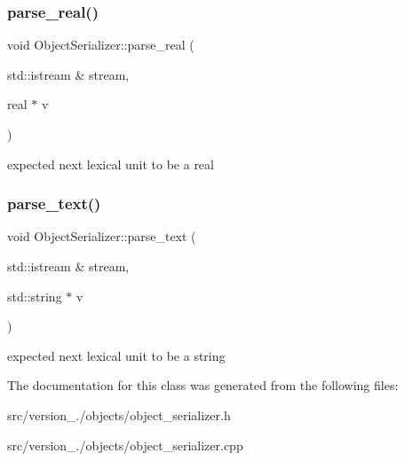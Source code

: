 \subsubsection{\texorpdfstring{parse\+\_\+real()}{parse\_real()}}
{\footnotesize\ttfamily void Object\+Serializer\+::parse\+\_\+real (\begin{DoxyParamCaption}\item[{std\+::istream \&}]{stream,  }\item[{real $\ast$}]{v }\end{DoxyParamCaption})\hspace{0.3cm}{\ttfamily [static]}}

expected next lexical unit to be a real \mbox{\label{classez_1_1objects_1_1ObjectSerializer_a6c36b150271e3e410c52e6bb7f14c55c}} 
\subsubsection{\texorpdfstring{parse\+\_\+text()}{parse\_text()}}
{\footnotesize\ttfamily void Object\+Serializer\+::parse\+\_\+text (\begin{DoxyParamCaption}\item[{std\+::istream \&}]{stream,  }\item[{std\+::string $\ast$}]{v }\end{DoxyParamCaption})\hspace{0.3cm}{\ttfamily [static]}}

expected next lexical unit to be a string 

The documentation for this class was generated from the following files\+:\begin{DoxyCompactItemize}
\item 
src/version\+\_./objects/object\+\_\+serializer.\+h\item 
src/version\+\_./objects/object\+\_\+serializer.\+cpp\end{DoxyCompactItemize}
